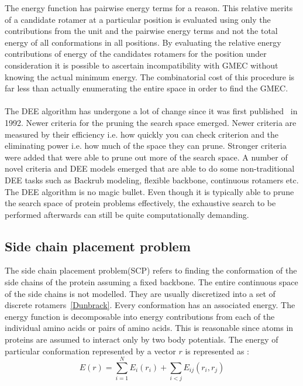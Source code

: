 \documentclass{article}
\begin{document}
The energy function has pairwise energy terms for a reason. This relative merits of a candidate rotamer at a particular position is evaluated using only the contributions from the unit and the pairwise energy terms and not the total energy of all conformations in all positions. By evaluating the relative energy contributions of energy of the candidates rotamers for the position under consideration it is possible to ascertain incompatibility with GMEC without knowing the actual minimum energy. The combinatorial cost of this procedure is far less than actually enumerating the entire space in order to find the GMEC. 
\\
\\
The DEE algorithm has undergone a lot of change since it was first published~\cite{Desmet1992} in 1992. Newer criteria for the pruning the search space emerged. Newer criteria are measured by their efficiency i.e. how quickly you can check criterion and the eliminating power i.e. how much of the space they can prune. Stronger criteria were added that were able to prune out more of the search space. A number of novel criteria and DEE models emerged that are able to do some non-traditional DEE tasks such as Backrub modeling, flexible backbone, continuous rotamers etc. The DEE algorithm is no magic bullet. Even though it is typically able to prune the search space of protein problems effectively, the exhaustive search to be performed afterwards can still be quite computationally demanding.

\subsection{Side chain placement problem}
The side chain placement problem(SCP) refers to finding the conformation of the side chains of the protein assuming a fixed backbone. The entire continuous space of the side chains is not modelled. They are usually discretized into a set of discrete rotamers~\ref{Dunbrack}. Every conformation has an associated energy. The energy function is decomposable into energy contributions from each of the individual amino acids or pairs of amino acids. This is reasonable since atoms in proteins are assumed to interact only by two body potentials. The energy of particular conformation represented by a vector $r$ is represented as : 
\[
E(r) = \sum_{i=1}^{N}E_i(r_i) + \sum_{i<j}E_{ij}(r_i,r_j)
\]
\end{document}
